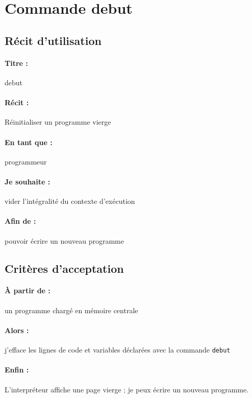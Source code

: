     \section{Commande debut}
    \subsection*{Récit d'utilisation}

    \paragraph{Titre : } debut
    \paragraph{Récit : } Réinitialiser un programme vierge
    \paragraph{En tant que : } programmeur
    \paragraph{Je souhaite : } vider l'intégralité du contexte d'exécution
    \paragraph{Afin de : } pouvoir écrire un nouveau programme

    \subsection*{Critères d'acceptation}

    \paragraph{À partir de : } un programme chargé en mémoire centrale
    \paragraph{Alors : } j'efface les lignes de code et variables déclarées
                         avec la commande \verb|debut|
    \paragraph{Enfin : } L'interpréteur affiche une page vierge ; je peux écrire un nouveau programme.